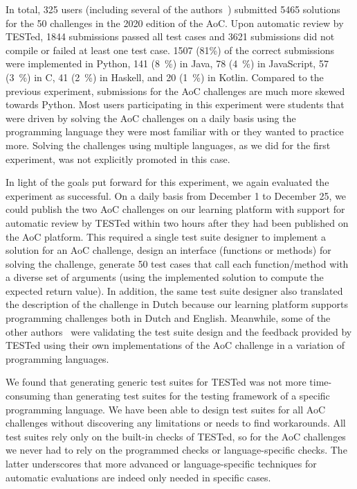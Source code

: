 \documentclass[../main]{subfiles}
\begin{document}
In total, \num{325} users (including several of the authors~\autocite{strijbolTESTedEducationalTesting2023}) submitted \num{5465} solutions for the \num{50} challenges in the 2020 edition of the AoC. Upon automatic review by TESTed, \num{1844} submissions passed all test cases and \num{3621} submissions did not compile or failed at least one test case.
\num{1507} (81\%) of the correct submissions were implemented in Python, \num{141} (\qty{8}{\percent}) in Java, \num{78} (\qty{4}{\percent}) in JavaScript, \num{57} (\qty{3}{\percent}) in C, \num{41} (\qty{2}{\percent}) in Haskell, and \num{20} (\qty{1}{\percent}) in Kotlin.
Compared to the previous experiment, submissions for the AoC challenges are much more skewed towards Python.
Most users participating in this experiment were students that were driven by solving the AoC challenges on a daily basis using the programming language they were most familiar with or they wanted to practice more.
Solving the challenges using multiple languages, as we did for the first experiment, was not explicitly promoted in this case.

In light of the goals put forward for this experiment, we again evaluated the experiment as successful.
On a daily basis from December 1 to December 25, we could publish the two AoC challenges on our learning platform with support for automatic review by TESTed within two hours after they had been published on the AoC platform.
This required a single test suite designer to implement a solution for an AoC challenge, design an interface (functions or methods) for solving the challenge, generate 50 test cases that call each function/method with a diverse set of arguments (using the implemented solution to compute the expected return value).
In addition, the same test suite designer also translated the description of the challenge in Dutch because our learning platform supports programming challenges both in Dutch and English.
Meanwhile, some of the other authors~\autocite{strijbolTESTedEducationalTesting2023} were validating the test suite design and the feedback provided by TESTed using their own implementations of the AoC challenge in a variation of programming languages.

We found that generating generic test suites for TESTed was not more time-consuming than generating test suites for the testing framework of a specific programming language.
We have been able to design test suites for all AoC challenges without discovering any limitations or needs to find workarounds.
All test suites rely only on the built-in checks of TESTed, so for the AoC challenges we never had to rely on the programmed checks or language-specific checks.
The latter underscores that more advanced or language-specific techniques for automatic evaluations are indeed only needed in specific cases.
\end{document}
